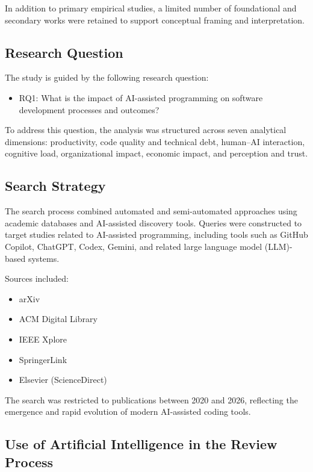 \documentclass[conference]{IEEEtran}
\begin{document}
In addition to primary empirical studies, a limited number of foundational and secondary works were retained to support conceptual framing and interpretation.

\subsection{Research Question}

The study is guided by the following research question:

\begin{itemize}
    \item RQ1: What is the impact of AI-assisted programming on software development processes and outcomes?
\end{itemize}

To address this question, the analysis was structured across seven analytical dimensions: productivity, code quality and technical debt, human--AI interaction, cognitive load, organizational impact, economic impact, and perception and trust.

\subsection{Search Strategy}

The search process combined automated and semi-automated approaches using academic databases and AI-assisted discovery tools. Queries were constructed to target studies related to AI-assisted programming, including tools such as GitHub Copilot, ChatGPT, Codex, Gemini, and related large language model (LLM)-based systems.

Sources included:
\begin{itemize}
    \item arXiv
    \item ACM Digital Library
    \item IEEE Xplore
    \item SpringerLink
    \item Elsevier (ScienceDirect)
\end{itemize}

The search was restricted to publications between 2020 and 2026, reflecting the emergence and rapid evolution of modern AI-assisted coding tools.

\subsection{Use of Artificial Intelligence in the Review Process}
\end{document}
